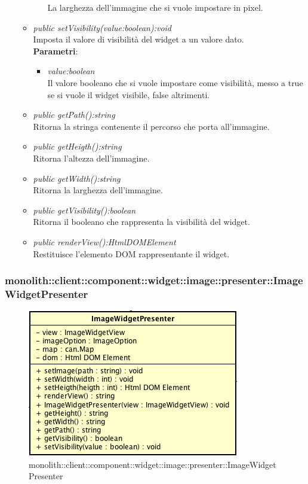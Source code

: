 \begin{itemize}
\begin{itemize}
\begin{itemize}
		La larghezza dell'immagine che si vuole impostare in pixel.
		\end{itemize} 
	\item \textit{public setVisibility(value:boolean):void}\\
	Imposta il valore di visibilità del widget a un valore dato.
			\\ \textbf{Parametri}: \begin{itemize}
			\item \textit{value:boolean}\\
			Il valore booleano che si vuole impostare come visibilità, messo a true se si vuole il widget visibile, false altrimenti.
		\end{itemize} 
	\item \textit{public getPath():string}\\
	Ritorna la stringa contenente il percorso che porta all'immagine.
	\item \textit{public getHeigth():string}\\
	Ritorna l'altezza dell'immagine.
	\item \textit{public getWidth():string}\\
	Ritorna la larghezza dell'immagine.
	\item \textit{public getVisibility():boolean}\\
	Ritorna il booleano che rappresenta la visibilità del widget.
	\item \textit{public renderView():HtmlDOMElement}\\
	Restituisce l'elemento DOM rappresentante il widget.
	\end{itemize}
\end{itemize}

\subsubsection{monolith::client::component::widget::image::presenter::ImageWidgetPresenter}

\label{monolith::client::component::widget::image::presenter::ImageWidgetPresenter}
\begin{figure}[H]
	\centering
	\includegraphics[scale=0.5]{Sezioni/SottosezioniST/img/ImageWidgetPresenter.png}
	\caption{monolith::client::component::widget::image::presenter::ImageWidgetPresenter}
\end{figure}

